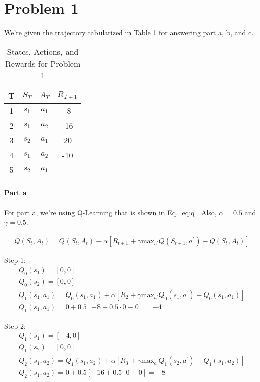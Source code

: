 \documentclass[12pt]{article}
\begin{document}
\maketitle

\section{Problem 1}

We're given the trajectory tabularized in Table \ref{tab:1} for answering part a, b, and c.

\begin{table}[!htb]
  \centering
  \caption{States, Actions, and Rewards for Problem 1}
  \label{tab:1}
  \begin{tabular}{|c|c|c|c|}
    \hline
    T & $S_T$ & $A_T$ & $R_{T+1}$ \\ \hline
    1 & $s_1$ & $a_1$ & -8        \\ \hline
    2 & $s_1$ & $a_2$ & -16       \\ \hline
    3 & $s_2$ & $a_1$ & 20        \\ \hline
    4 & $s_1$ & $a_2$ & -10       \\ \hline
    5 & $s_2$ & $a_1$ &           \\ \hline
  \end{tabular}
\end{table}

\paragraph{Part a}
For part a, we're using Q-Learning that is shown in Eq. \ref{eq:q}. Also, $\alpha = 0.5$ and $\gamma = 0.5$.

\begin{gather}
  Q(S_t, A_t) = Q(S_t, A_t) + \alpha [R_{t+1} + \gamma \text{max}_{a^\prime} Q(S_{t+1}, a^\prime) - Q(S_t, A_t)] \label{eq:q}
\end{gather}

Step 1:
\begin{gather*}
  Q_0(s_1) = [0, 0] \\
  Q_0(s_2) = [0, 0] \\
  Q_1(s_1, a_1) = Q_0(s_1, a_1) + \alpha [R_2 + \gamma \text{max}_{a^\prime} Q_0(s_1, a^\prime) - Q_0(s_1, a_1)] \\
  Q_1(s_1, a_1) = 0 + 0.5 [-8 + 0.5 \cdot 0 - 0] = -4
\end{gather*}

Step 2:
\begin{gather*}
  Q_1(s_1) = [-4, 0] \\
  Q_1(s_2) = [0, 0] \\
  Q_2(s_1, a_2) = Q_1(s_1, a_2) + \alpha [R_3 + \gamma \text{max}_{a^\prime} Q_1(s_2, a^\prime) - Q_1(s_1, a_2)] \\
  Q_2(s_1, a_2) = 0 + 0.5 [-16 + 0.5 \cdot 0 - 0] = -8
\end{gather*}
\end{document}

